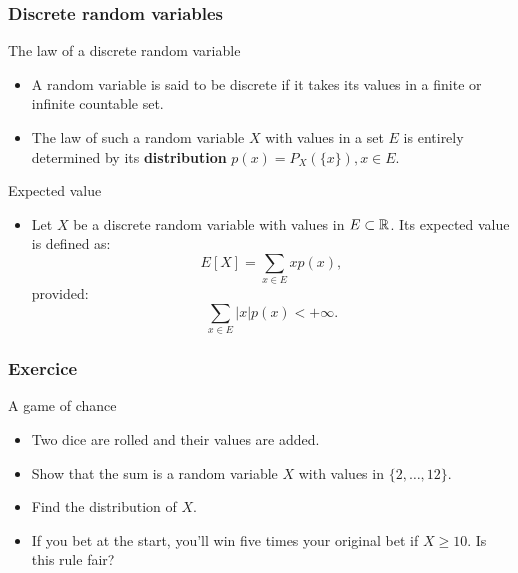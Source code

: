 \begin{frame}
    \frametitle{Discrete random variables}
\begin{block}{The law of a discrete random variable}
    \begin{itemize}
        \item<+-> A random variable is said to be discrete if it takes its 
        values in a finite or infinite countable set.
        \item<+-> The law of such a random variable $X$ with values in a set $E$ is entirely determined
        by its \textbf{distribution} $p(x) = P_X\left( \{x\} \right), x \in E.$
    \end{itemize}
\end{block}
\begin{block}{Expected value}
    \begin{itemize}
        \item<+-> Let $X$ be a discrete random variable with values in $E\subset \mathbb{R}$. 
        Its expected value is defined as:
        \begin{equation}
            E\left[ X \right] = \sum_{x \in E} x p(x),
        \end{equation}
        provided:
        \begin{equation}
            \sum_{x \in E} \lvert x \rvert p(x)< +\infty.
         \end{equation}
    \end{itemize}
\end{block}
\end{frame}
\begin{frame}
    \frametitle{Exercice}
\begin{block}{A game of chance}
    \begin{itemize}
        \item<+-> Two dice are rolled and their values are added.
        \item<+-> Show that the sum is a random variable $X$ with values in 
        $\{2, \dots, 12 \}.$
        \item<+-> Find the distribution of $X$.
        \item<+-> If you bet at the start, you'll win five times
         your original bet if $X \geq 10.$ Is this rule fair?
    \end{itemize}
\end{block}
\end{frame}
